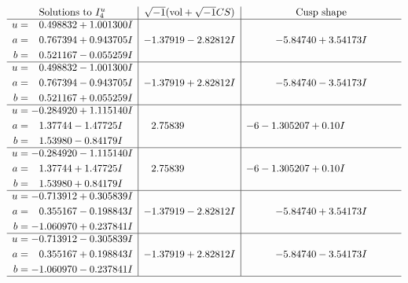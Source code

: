 \documentclass[1p]{elsarticle_modified}
\theoremstyle{definition}
\newcommand{\I}{\sqrt{-1}}
\begin{document}
$$\begin{array}{c|c|c}  
\text{Solutions to }I^u_{4}& \I (\text{vol} + \sqrt{-1}CS) & \text{Cusp shape}\\
 \hline 
\begin{aligned}
u &= \phantom{-}0.498832 + 1.001300 I \\
a &= \phantom{-}0.767394 + 0.943705 I \\
b &= \phantom{-}0.521167 - 0.055259 I\end{aligned}
 & -1.37919 - 2.82812 I & -5.84740 + 3.54173 I \\ \hline\begin{aligned}
u &= \phantom{-}0.498832 - 1.001300 I \\
a &= \phantom{-}0.767394 - 0.943705 I \\
b &= \phantom{-}0.521167 + 0.055259 I\end{aligned}
 & -1.37919 + 2.82812 I & -5.84740 - 3.54173 I \\ \hline\begin{aligned}
u &= -0.284920 + 1.115140 I \\
a &= \phantom{-}1.37744 - 1.47725 I \\
b &= \phantom{-}1.53980 - 0.84179 I\end{aligned}
 & \phantom{-}2.75839\phantom{ +0.000000I} &                  -6
-1.305207 + 0. 10   I\phantom{ +0.000000I} \\ \hline\begin{aligned}
u &= -0.284920 - 1.115140 I \\
a &= \phantom{-}1.37744 + 1.47725 I \\
b &= \phantom{-}1.53980 + 0.84179 I\end{aligned}
 & \phantom{-}2.75839\phantom{ +0.000000I} &                  -6
-1.305207 + 0. 10   I\phantom{ +0.000000I} \\ \hline\begin{aligned}
u &= -0.713912 + 0.305839 I \\
a &= \phantom{-}0.355167 - 0.198843 I \\
b &= -1.060970 + 0.237841 I\end{aligned}
 & -1.37919 - 2.82812 I & -5.84740 + 3.54173 I \\ \hline\begin{aligned}
u &= -0.713912 - 0.305839 I \\
a &= \phantom{-}0.355167 + 0.198843 I \\
b &= -1.060970 - 0.237841 I\end{aligned}
 & -1.37919 + 2.82812 I & -5.84740 - 3.54173 I\\
 \hline 
 \end{array}$$\newpage\newpage\renewcommand{\arraystretch}{1}
\end{document}
